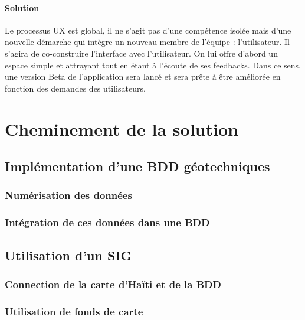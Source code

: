         \paragraph{Solution}
        Le processus UX est global, il ne s’agit pas d’une compétence isolée mais d’une nouvelle 
        démarche qui intègre un nouveau membre de l’équipe : l’utilisateur. \cite{Schaudel2020}
        Il s'agira de co-construire l'interface avec l'utilisateur. On lui offre d'abord un espace simple et attrayant
        tout en étant à l'écoute de ses feedbacks. Dans ce sens, une version Beta de l'application sera lancé et sera prête
        à être améliorée en fonction des demandes des utilisateurs.
        \par


    \section{Cheminement de la solution}
        \subsection{Implémentation d'une BDD géotechniques}
            \subsubsection{Numérisation des données}
                
            \subsubsection{Intégration de ces données dans une BDD}
                
        \subsection{Utilisation d'un SIG}
            \subsubsection{Connection de la carte d'Haïti et de la BDD}
                
            \subsubsection{Utilisation de fonds de carte}
                
